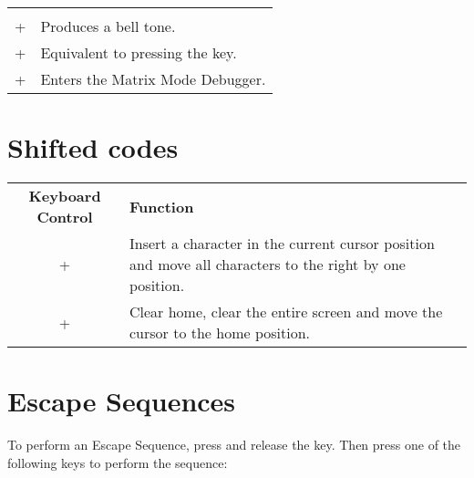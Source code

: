 \begin{center}
\begin{longtable}{c|L{5.5cm}}
  \hhline{==}
   \\
  \hhline{==}

 +  &
Produces a bell tone.\\
\hline
{} + \megakey{[} &
Equivalent to pressing the  key.\\
\hline
{} + \megakey{*} &
Enters the Matrix Mode Debugger.\\
\hline

\end{longtable}
\end{center}

\newpage

\section{Shifted codes}
\label{appendix:shiftedcodes}

\begin{center}
\begin{longtable}{c|L{5.5cm}}
	\textbf{Keyboard Control} & \textbf{Function}\\
  \hhline{==}
	\endhead

 +  &
Insert a character in the current cursor position and move all characters to the right by one position.\\
\hline
{} +  &
Clear home, clear the entire screen and move the cursor to the home position.\\
\hline

\end{longtable}
\end{center}



\section{Escape Sequences}
\label{appendix:escapesequences}

To perform an Escape Sequence, press and release the  key. Then press one of the following keys to perform the sequence:

